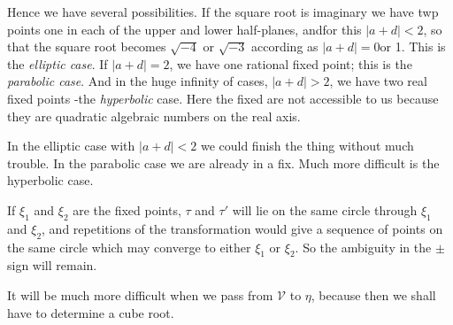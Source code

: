 Hence we have several possibilities. If the square root is imaginary we
have twp points one in each of the upper and lower half-planes,
and\pageoriginale for this $|a+d|<2$, so that the square root
becomes $\sqrt{-4}$ or $\sqrt{-3}$ according as $|a+d|=0$or 1. This
is the \textit{elliptic case}. If $|a+d|=2$, we have one rational
fixed point; this is the \textit{parabolic case}. And in the huge
infinity of cases, $|a+d|>2$, we have two real fixed points -the
\textit{hyperbolic} case. Here the fixed are not accessible to us
because they are quadratic algebraic numbers on the real axis.

In the elliptic case with $|a+d|<2$ we could finish the thing without
much trouble. In the parabolic case we are already in a fix. Much more
difficult is the hyperbolic case.

\medskip
\noindent
\begin{minipage}[c]{4.5cm}
\qquad  If $\xi_1$ and $\xi_2$ are the fixed points, $\tau$ and $\tau'$ will
lie on the same circle through $\xi_1$ and $\xi_2$, and repetitions of
the transformation would give a sequence of points on the same circle
which may converge to either $\xi_1$ or $\xi_2$. So the ambiguity in
the $\pm$ sign will remain.
\end{minipage}
\begin{minipage}[c]{5.5cm}
  \begin{figure}[H]
  \end{figure}
\end{minipage}

It will be much more difficult when we pass from $\mathscr{V}$ to
$\eta$, because then we shall have to determine a cube root.


